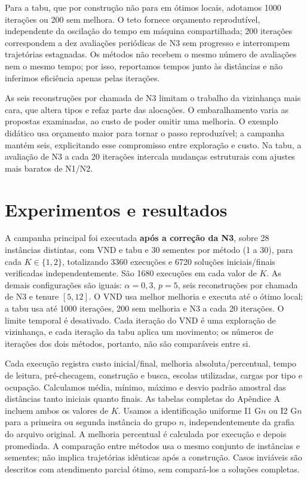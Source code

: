 \documentclass[12pt]{article}
\begin{document}
Para a tabu, que por construção não para em ótimos locais, adotamos 1000 iterações ou 200 sem melhora. O teto fornece orçamento reprodutível, independente da oscilação do tempo em máquina compartilhada; 200 iterações correspondem a dez avaliações periódicas de N3 sem progresso e interrompem trajetórias estagnadas. Os métodos não recebem o mesmo número de avaliações nem o mesmo tempo; por isso, reportamos tempos junto às distâncias e não inferimos eficiência apenas pelas iterações.

As seis reconstruções por chamada de N3 limitam o trabalho da vizinhança mais cara, que altera tipos e refaz parte das alocações. O embaralhamento varia as propostas examinadas, ao custo de poder omitir uma melhoria. O exemplo didático usa orçamento maior para tornar o passo reproduzível; a campanha mantém seis, explicitando esse compromisso entre exploração e custo. Na tabu, a avaliação de N3 a cada 20 iterações intercala mudanças estruturais com ajustes mais baratos de N1/N2.

\section{Experimentos e resultados}
A campanha principal foi executada \textbf{após a correção da N3}, sobre 28 instâncias distintas, com VND e tabu e 30 sementes por método (1 a 30), para cada $K\in\{1,2\}$, totalizando 3360 execuções e 6720 soluções iniciais/finais verificadas independentemente. São 1680 execuções em cada valor de $K$. As demais configurações são iguais: $\alpha=0{,}3$, $p=5$, seis reconstruções por chamada de N3 e tenure $[5,12]$. O VND usa melhor melhoria e executa até o ótimo local; a tabu usa até 1000 iterações, 200 sem melhoria e N3 a cada 20 iterações. O limite temporal é desativado. Cada iteração do VND é uma exploração de vizinhança, e cada iteração da tabu aplica um movimento; os números de iterações dos dois métodos, portanto, não são comparáveis entre si.

Cada execução registra custo inicial/final, melhoria absoluta/percentual, tempo de leitura, pré-checagem, construção e busca, escolas utilizadas, cargas por tipo e ocupação. Calculamos média, mínimo, máximo e desvio padrão amostral das distâncias tanto iniciais quanto finais. As tabelas completas do Apêndice A incluem ambos os valores de $K$. Usamos a identificação uniforme I1 G$n$ ou I2 G$n$ para a primeira ou segunda instância do grupo $n$, independentemente da grafia do arquivo original. A melhoria percentual é calculada por execução e depois promediada. A comparação entre métodos usa o mesmo conjunto de instâncias e sementes; não implica trajetórias idênticas após a construção. Casos inviáveis são descritos com atendimento parcial ótimo, sem compará-los a soluções completas.
\end{document}

